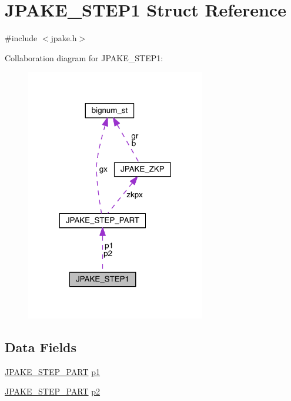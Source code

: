 \hypertarget{struct_j_p_a_k_e___s_t_e_p1}{}\section{J\+P\+A\+K\+E\+\_\+\+S\+T\+E\+P1 Struct Reference}
\label{struct_j_p_a_k_e___s_t_e_p1}


{\ttfamily \#include $<$jpake.\+h$>$}



Collaboration diagram for J\+P\+A\+K\+E\+\_\+\+S\+T\+E\+P1\+:\nopagebreak
\begin{figure}[H]
\begin{center}
\leavevmode
\includegraphics[width=222pt]{struct_j_p_a_k_e___s_t_e_p1__coll__graph}
\end{center}
\end{figure}
\subsection*{Data Fields}
\begin{DoxyCompactItemize}
\item 
\hyperlink{struct_j_p_a_k_e___s_t_e_p___p_a_r_t}{J\+P\+A\+K\+E\+\_\+\+S\+T\+E\+P\+\_\+\+P\+A\+RT} \hyperlink{struct_j_p_a_k_e___s_t_e_p1_a2d05ea7e4f2e2d9c9d962924118fd6c1}{p1}
\item 
\hyperlink{struct_j_p_a_k_e___s_t_e_p___p_a_r_t}{J\+P\+A\+K\+E\+\_\+\+S\+T\+E\+P\+\_\+\+P\+A\+RT} \hyperlink{struct_j_p_a_k_e___s_t_e_p1_a93200fcdf47251b89b07183d1c2628e0}{p2}
\end{DoxyCompactItemize}


